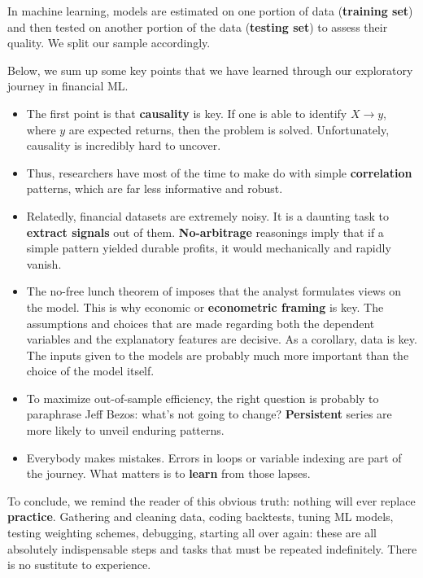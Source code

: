 In machine learning, models are estimated on one portion of data (\textbf{training set}) and then tested on another portion of the data (\textbf{testing set}) to assess their quality. We split our sample accordingly.

Below, we sum up some key points that we have learned through our exploratory journey in financial ML.

\begin{itemize}
\item The first point is that \textbf{causality} is key. If one is able to identify $X \rightarrow y$, where $y$ are expected returns, then the problem is solved. Unfortunately, causality is incredibly hard to uncover.
\item Thus, researchers have most of the time to make do with simple \textbf{correlation} patterns, which are far less informative and robust.
\item Relatedly, financial datasets are extremely noisy. It is a daunting task to \textbf{extract signals} out of them. \textbf{No-arbitrage} reasonings imply that if a simple pattern yielded durable profits, it would mechanically and rapidly vanish.
\item The no-free lunch theorem of \citep{wolpert1992connection} imposes that the analyst formulates views on the model. This is why economic or \textbf{econometric framing} is key. The assumptions and choices that are made regarding both the dependent variables and the explanatory features are decisive. As a corollary, data is key. The inputs given to the models are probably much more important than the choice of the model itself.
\item To maximize out-of-sample efficiency, the right question is probably to paraphrase Jeff Bezos: what's not going to change? \textbf{Persistent} series are more likely to unveil enduring patterns.
\item Everybody makes mistakes. Errors in loops or variable indexing are part of the journey. What matters is to \textbf{learn} from those lapses.
\end{itemize}

To conclude, we remind the reader of this obvious truth: nothing will ever replace \textbf{practice}. Gathering and cleaning data, coding backtests, tuning ML models, testing weighting schemes, debugging, starting all over again: these are all absolutely indispensable steps and tasks that must be repeated indefinitely. There is no sustitute to experience.